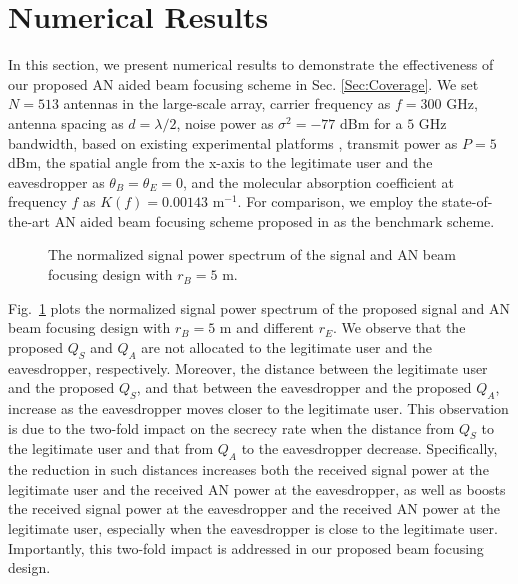 \documentclass[10pt,technote]{IEEEtran}
\newcommand{\1}{\mathbbm{1}}
\begin{document}
\section{Numerical Results}\label{Sec:Num}

In this section, we present numerical results to demonstrate the effectiveness of our proposed AN aided beam focusing scheme in Sec. \ref{Sec:Coverage}. We set $N=513$ antennas in the large-scale array, carrier frequency as $f=300$ GHz, antenna spacing as $d=\lambda/2$, noise power as $\sigma^2 = -77$ dBm for a $5$ GHz bandwidth, based on existing experimental platforms \cite{SEN2020107370}, transmit power as $P = 5$ dBm, the spatial angle from the x-axis to the legitimate user and the eavesdropper as $\theta_B=\theta_E=0$, and the molecular absorption coefficient at frequency $f$ as $K(f)=0.00143$ $\mathrm{m}^{-1}$. For comparison, we employ the state-of-the-art AN aided beam focusing scheme proposed in  \cite{zhang2024performanceanalysislowcomplexitybeamforming} as the benchmark scheme.

\begin{figure}[t]
    \centering
        \vspace{-0.5em}
        \caption{The normalized signal power spectrum of the signal and AN beam focusing design with $r_B=5$ m.}
        \vspace{-1em}
        \label{fig:Beam}
\end{figure}

Fig.~\ref{fig:Beam} plots the normalized signal power spectrum of the proposed signal and AN beam focusing design with $r_B=5$ m and different $r_E$. We observe that the proposed $Q_S$ and $Q_A$ are not allocated to the legitimate user and the eavesdropper, respectively. Moreover, the distance between the legitimate user and the proposed $Q_S$, and that between the eavesdropper and the proposed $Q_A$, increase as the eavesdropper moves closer to the legitimate user. This observation is due to the two-fold impact on the secrecy rate when the distance from $Q_S$ to the legitimate user and that from $Q_A$ to the eavesdropper decrease. Specifically, the reduction in such distances increases both the received signal power at the legitimate user and the received AN power at the eavesdropper, as well as boosts the received signal power at the eavesdropper and the received AN power at the legitimate user, especially when the eavesdropper is close to the legitimate user. Importantly, this two-fold impact is addressed in our proposed beam focusing design.
\end{document}
